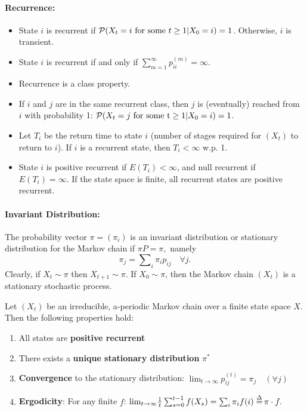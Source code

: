 \paragraph{Recurrence:}
\begin{itemize}
\item State $i$ is recurrent if ${\cal P}({X_t} = i{ \textrm{ for some }}t \ge 1|{X_0} = i) = 1$. Otherwise, $i$ is transient.
\item State $i$ is recurrent if and only if $\sum\nolimits_{m = 1}^\infty  {p_{ii}^{(m)}}  = \infty $.
\item Recurrence is a class property.
\item If $i$ and $j$ are in the same recurrent class, then $j$ is (eventually) reached from $i$ with probability 1:  ${\cal P}({X_t} = j{\textrm{ for some t}} \ge 1|{X_0} = i) = 1$.
\item Let ${T_i}$ be the return time to state $i$  (number of stages required for $({X_t})$ to return to $i$). If $i$ is a recurrent state, then ${T_i} < \infty $ w.p. 1.
\item State $i$ is positive recurrent if  $E({T_i}) < \infty $, and null recurrent if $E({T_i}) = \infty $.
If the state space is finite, all recurrent states are positive recurrent.
\end{itemize}

\paragraph{Invariant Distribution:} The probability vector $\pi  = ({\pi _i})$ is an invariant distribution or stationary distribution for the Markov chain if $\pi P = \pi ,$ namely
\[{\pi _j} = \sum\nolimits_i^{} {{\pi _i}} {p_{ij}}\quad \forall j.\]
Clearly, if ${X_t} \sim \pi $ then ${X_{t + 1}} \sim \pi $. If ${X_0} \sim \pi $, then the Markov chain $({X_t})$ is a stationary stochastic process.

\begin{theorem} Let $({X_t})$ be an irreducible,  a-periodic Markov chain over a finite state space $X$.  Then the following properties hold:
\begin{enumerate}
\item All states are \textbf{positive recurrent}
\item There exists a \textbf{unique stationary distribution} ${\pi ^*}$
\item \textbf{Convergence} to the stationary distribution: ${\lim _{t \to \infty }}p_{ij}^{(t)} = {\pi _j}\quad (\forall j)$
\item \textbf{Ergodicity}: For any finite $f$: ${\lim _{t \to \infty }}\frac{1}{t}\sum\nolimits_{s = 0}^{t - 1} {f({X_s}) = \sum\nolimits_i {\pi_i f(i) \buildrel \Delta \over = } } \,\pi  \cdot f.$
\end{enumerate}
\end{theorem}

